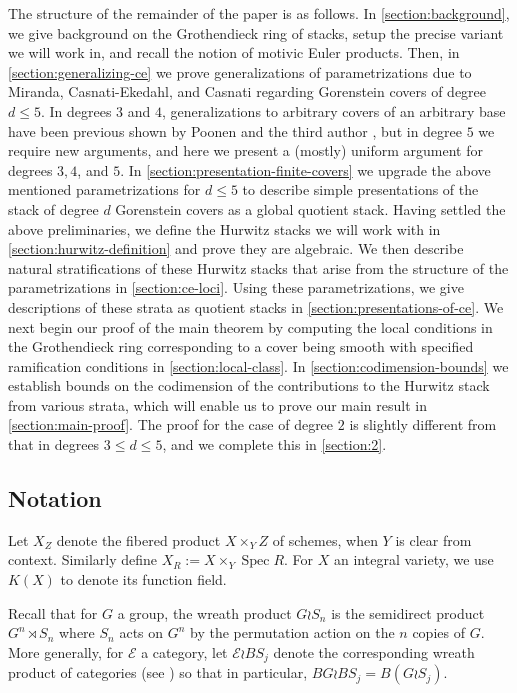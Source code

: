 \documentclass[12 pt]{amsart}
\newcommand{\rboxed}[1]{#1}
\theoremstyle{plain}
\theoremstyle{definition}
\theoremstyle{remark}
\numberwithin{equation}{section}
\newcommand\sce{\mathscr E}
\DeclareMathOperator\spec{\operatorname{Spec}}
\begin{document}
The structure of the remainder of the paper is as follows.
In \autoref{section:background}, we give background on the Grothendieck ring of
stacks, setup the precise variant we will work in, and recall the notion of
motivic Euler products.
Then, in \autoref{section:generalizing-ce}
we prove generalizations of parametrizations due to Miranda, Casnati-Ekedahl, and
Casnati regarding Gorenstein covers of degree $d\leq 5$.
In degrees $3$ and $4$, generalizations to arbitrary covers of an arbitrary base have been previous shown by Poonen \cite[Prop.\ 5.1]{Poonen2008} and the third author \cite[Thm.\ 1.1]{Wood2011}, but in degree $5$ we require new arguments, and here we present a (mostly) uniform argument for degrees $3,4$, and $5$.
In
\autoref{section:presentation-finite-covers}
we upgrade the above mentioned parametrizations for $d \leq 5$
to describe simple presentations of the stack of degree $d$ Gorenstein covers as
a global quotient stack.
Having settled the above preliminaries, we define
the Hurwitz stacks we will work with in 
\autoref{section:hurwitz-definition}
and prove they are algebraic.
We then describe natural stratifications of these Hurwitz stacks
that arise from the structure of the parametrizations in
\autoref{section:ce-loci}.
Using these parametrizations, we give descriptions of these strata
as quotient stacks in
\autoref{section:presentations-of-ce}.
We next begin our proof of the main theorem by computing the local conditions in
the Grothendieck ring corresponding to a cover being smooth with specified
ramification conditions in 
\autoref{section:local-class}.
In \autoref{section:codimension-bounds}
we establish bounds on the codimension of the contributions to the Hurwitz stack 
from various  strata, which will enable us to prove
our main result in
\autoref{section:main-proof}.
The proof for the case of degree $2$ is slightly different from that
in degrees $3 \leq d \leq 5$, and we complete this in
\autoref{section:2}.


\subsection{Notation} \label{subsection:notation}

Let $\rboxed{X_Z}$ denote the fibered product $X \times_Y
Z$ of schemes, when $Y$ is clear from context.  Similarly define $\rboxed{X_R} := X
\times_Y \spec R$.
For $X$ an integral variety, we use $K(X)$ to denote its function field.

Recall that for $G$ a group, the wreath product $\rboxed{G \wr S_n}$
is  the semidirect product $G^n \rtimes S_n$ where $S_n$ acts on
$G^n$ by the permutation action on the $n$ copies of $G$.   More generally, for $\sce$ a category, let
$\rboxed{\sce \wr BS_j}$ denote the corresponding wreath product of categories
(see \cite[p. 5]{ekedahlGeometricInvariantFinite2009}) so that in particular,
$BG \wr BS_j = B(G \wr S_j)$.
\end{document}
